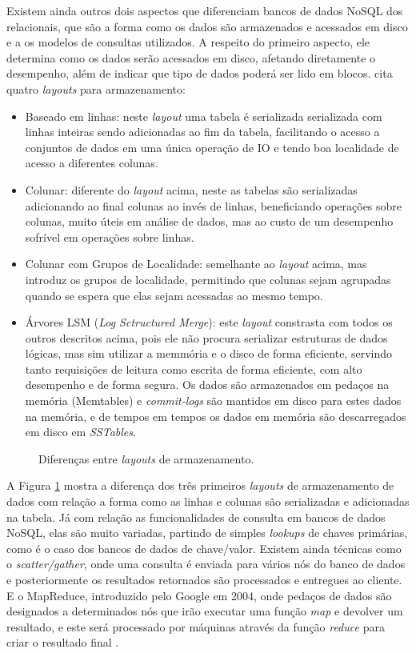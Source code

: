 \documentclass[diss]{template/setrem}
\begin{document}
Existem ainda outros dois aspectos que diferenciam bancos de dados NoSQL dos relacionais, que são a forma como os dados são armazenados e acessados em disco e a os modelos de consultas utilizados. A respeito do primeiro aspecto, ele determina como os dados serão acessados em disco, afetando diretamente o desempenho, além de indicar que tipo de dados poderá ser lido em blocos. \citet{Strauch2011} cita quatro \emph{layouts} para armazenamento:
\begin{itemize}
	\item Baseado em linhas: neste \emph{layout} uma tabela é serializada serializada com linhas inteiras sendo adicionadas ao fim da tabela, facilitando o acesso a conjuntos de dados em uma única operação de IO e tendo boa localidade de acesso a diferentes colunas.
	\item Colunar: diferente do \emph{layout} acima, neste as tabelas são serializadas adicionando ao final colunas ao invés de linhas, beneficiando operações sobre colunas, muito úteis em análise de dados, mas ao custo de um desempenho sofrível em operações sobre linhas.
	\item Colunar com Grupos de Localidade: semelhante ao \emph{layout} acima, mas introduz os grupos de localidade, permitindo que colunas sejam agrupadas quando se espera que elas sejam acessadas ao mesmo tempo.
	\item Árvores LSM (\emph{Log Sctructured Merge}): este \emph{layout} constrasta com todos os outros descritos acima, pois ele não procura serializar estruturas de dados lógicas, mas sim utilizar a memmória e o disco de forma eficiente, servindo tanto requisições de leitura como escrita de forma eficiente, com alto desempenho e de forma segura. Os dados são armazenados em pedaços na memória (Memtables) e \emph{commit-logs} são mantidos em disco para estes dados na memória, e de tempos em tempos os dados em memória são descarregados em disco em \emph{SSTables}.
\end{itemize}

\begin{figure}[!h]
    \caption{Diferenças entre \emph{layouts} de armazenamento.}
    \label{fig:storage-layouts}
\end{figure}

A Figura \ref{fig:storage-layouts} mostra a diferença dos três primeiros \emph{layouts} de armazenamento de dados com relação a forma como as linhas e colunas são serializadas e adicionadas na tabela. Já com relação as funcionalidades de consulta em bancos de dados NoSQL, elas são muito variadas, partindo de simples \emph{lookups} de chaves primárias, como é o caso dos bancos de dados de chave/valor. Existem ainda técnicas como o \emph{scatter/gather}, onde uma consulta é enviada para vários nós do banco de dados e posteriormente os resultados retornados são processados e entregues ao cliente. E o MapReduce, introduzido pelo Google em 2004, onde pedaços de dados são designados a determinados nós que irão executar uma função \emph{map} e devolver um resultado, e este será processado por máquinas através da função \emph{reduce} para criar o resultado final \citep{Strauch2011}.
\end{document}
